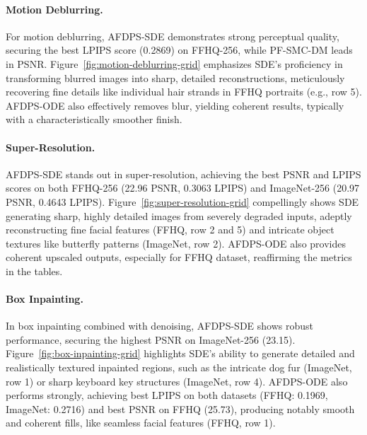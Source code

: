 \documentclass{article}
\numberwithin{equation}{section}
\newcommand{\haoxuan}[1]{\textcolor{orange}{(haoxuan: #1)}}
\begin{document}
\paragraph{Motion Deblurring.}
For motion deblurring, AFDPS-SDE demonstrates strong perceptual quality, securing the best LPIPS score (0.2869) on FFHQ-256, while PF-SMC-DM leads in PSNR. Figure~\ref{fig:motion-deblurring-grid} emphasizes SDE's proficiency in transforming blurred images into sharp, detailed reconstructions, meticulously recovering fine details like individual hair strands in FFHQ portraits (e.g., row 5). AFDPS-ODE also effectively removes blur, yielding coherent results, typically with a characteristically smoother finish.

\paragraph{Super-Resolution.}
AFDPS-SDE stands out in super-resolution, achieving the best PSNR and LPIPS scores on both FFHQ-256 (22.96 PSNR, 0.3063 LPIPS) and ImageNet-256 (20.97 PSNR, 0.4643 LPIPS). Figure~\ref{fig:super-resolution-grid} compellingly shows SDE generating sharp, highly detailed images from severely degraded inputs, adeptly reconstructing fine facial features (FFHQ, row 2 and 5) and intricate object textures like butterfly patterns (ImageNet, row 2). AFDPS-ODE also provides coherent upscaled outputs, especially for FFHQ dataset, reaffirming the metrics in the tables.

\paragraph{Box Inpainting.}
In box inpainting combined with denoising, AFDPS-SDE shows robust performance, securing the highest PSNR on ImageNet-256 (23.15). Figure~\ref{fig:box-inpainting-grid} highlights SDE's ability to generate detailed and realistically textured inpainted regions, such as the intricate dog fur (ImageNet, row 1) or sharp keyboard key structures (ImageNet, row 4). AFDPS-ODE also performs strongly, achieving best LPIPS on both datasets (FFHQ: 0.1969, ImageNet: 0.2716) and best PSNR on FFHQ (25.73), producing notably smooth and coherent fills, like seamless facial features (FFHQ, row 1).

\end{document}

